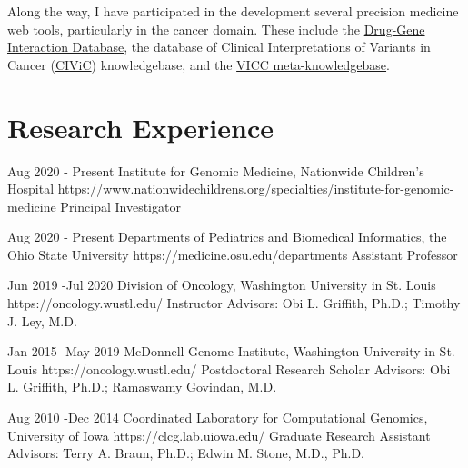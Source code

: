 \documentclass[10pt]{article} %
\begin{document}
\hfill \linebreak

Along the way, I have participated in the development several precision medicine web tools, particularly in the cancer domain. These include
the \href{www.dgidb.org}{Drug-Gene Interaction Database}, the database of Clinical Interpretations of Variants in Cancer
(\href{https://www.civicdb.org}{CIViC}) knowledgebase, and the \href{https://search.cancervariants.org}{VICC meta-knowledgebase}.


\section{Research Experience}

\compjob
{Aug 2020 - }{Present}
{Institute for Genomic Medicine, Nationwide Children's Hospital}
{https://www.nationwidechildrens.org/specialties/institute-for-genomic-medicine}
{Principal Investigator}


\compjob
{Aug 2020 - }{Present}
{Departments of Pediatrics and Biomedical Informatics, the Ohio State University}
{https://medicine.osu.edu/departments}
{Assistant Professor}


\job
{Jun 2019 -}{Jul 2020}
{Division of Oncology, Washington University in St. Louis}
{https://oncology.wustl.edu/}
{Instructor}
{Advisors: Obi L. Griffith, Ph.D.; Timothy J. Ley, M.D.}


\job
{Jan 2015 -}{May 2019}
{McDonnell Genome Institute, Washington University in St. Louis}
{https://oncology.wustl.edu/}
{Postdoctoral Research Scholar}
{Advisors: Obi L. Griffith, Ph.D.; Ramaswamy Govindan, M.D.}


\job
{Aug 2010 -}{Dec 2014}
{Coordinated Laboratory for Computational Genomics, University of Iowa}
{https://clcg.lab.uiowa.edu/}
{Graduate Research Assistant}
{Advisors: Terry A. Braun, Ph.D.; Edwin M. Stone, M.D., Ph.D.}

\end{document}
